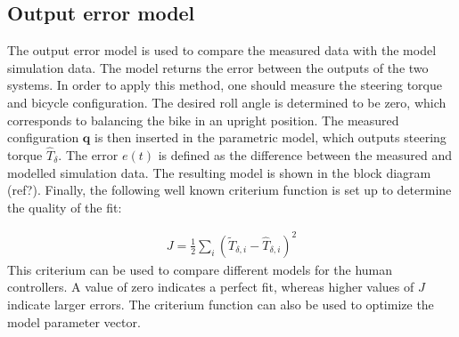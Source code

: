 \subsection{Output error model}
The output error model is used to compare the measured data with the model simulation data. The model returns the error between the outputs of the two systems. In order to apply this method, one should measure the steering torque and bicycle configuration. The desired roll angle is determined to be zero, which corresponds to balancing the bike in an upright position. The measured configuration $\mathbf{q}$ is then inserted in the parametric model, which outputs steering torque $\hat{T}_\delta$. The error $e(t)$ is defined as the difference between the measured and modelled simulation data. The resulting model is shown in the block diagram (ref?). Finally, the following well known criterium function is set up to determine the quality of the fit:
    
		\begin{align}
		J = \frac{1}{2}\sum_i\left(\tilde{T}_{\delta,i} - \hat{T}_{\delta,i} \right)^2
		\end{align}
This criterium can be used to compare different models for the human controllers. A value of zero indicates a perfect fit, whereas higher values of $J$ indicate larger errors. The criterium function can also be used to optimize the model parameter vector.
